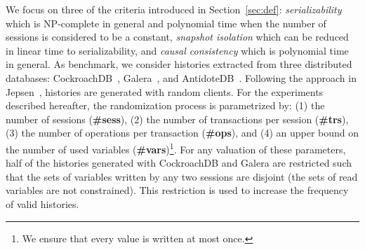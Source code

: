 We focus on three of the criteria introduced in Section~\ref{sec:def}: \emph{serializability} which is NP-complete in general and polynomial time when the number of sessions is considered to be a constant, \emph{snapshot isolation} which can be reduced in linear time to serializability, and \emph{causal consistency} which is polynomial time in general.
As benchmark, we consider histories extracted from three distributed databases: CockroachDB~\cite{cockroach}, Galera~\cite{galera}, and AntidoteDB~\cite{antidote}. %
%
Following the approach in Jepsen~\cite{jepsen},  histories are generated with random clients. For the experiments described hereafter, the randomization process is parametrized by: (1) the number of sessions ({\bf \#sess}), (2) the number of transactions per session ({\bf \#trs}), (3) the number of operations per transaction ({\bf \#ops}), and (4) an upper bound on the number of used variables ({\bf \#vars})\footnote{We ensure that every value is written at most once.}. For any valuation of these parameters, half of the histories generated with CockroachDB and Galera are restricted such that the sets of variables written by any two sessions are disjoint (the sets of read variables are not constrained). This restriction is used to increase the frequency of valid histories. 
